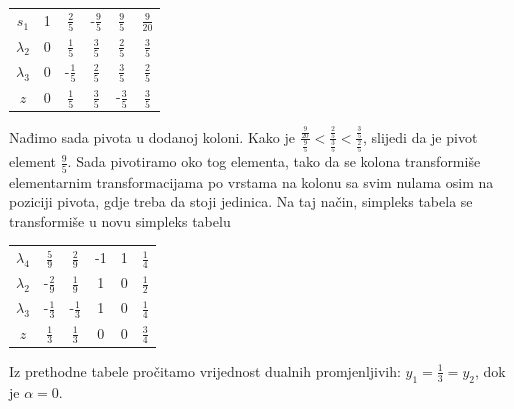 \documentclass[b5paper, utf8, 11pt, colorlinks]{book}
\theoremstyle{definition}
\begin{document}
\begin{center}
	
	\begin{tabular}{c|cccc|c}\vspace{1mm}
		$s_1$	    &   1      &    $\frac{2}{5}$          &   -$\frac{9}{5}$       &  $\frac{9}{5} $        &  $\frac{9}{20}$ \\\vspace{1mm}
		$\lambda_2$  &   0      &    $\frac{1}{5}$         &   $\frac{3}{5}$        &   $\frac{2}{5}$        &  $\frac{3}{5}$             \\\vspace{1mm}
		$\lambda_3$  &   0      &    -$\frac{1}{5}$        &   $\frac{2}{5}$        &   $\frac{3}{5}$         &  $\frac{2}{5}$            \\ \hline\vspace{1mm}
		$z$          &   0      &    $\frac{1}{5}$         &  $ \frac{3}{5}$        &   -$\frac{3}{5}$         & $\frac{3}{5}$
	\end{tabular}
	
\end{center} 
Nađimo sada pivota u dodanoj koloni. Kako je $\frac{\frac{9}{20}}{\frac95} < \frac{\frac25}{\frac35}< \frac{\frac35}{\frac25}$, slijedi da je pivot element $\frac{9}{5}$.  Sada pivotiramo oko tog elementa, tako da se kolona transformiše elementarnim transformacijama po vrstama na kolonu sa svim nulama osim na poziciji pivota, gdje treba da stoji jedinica. Na taj način, simpleks tabela se transformiše u novu simpleks tabelu 
\begin{center}
	
	\begin{tabular}{c|cccc|c}\vspace{1mm}
		$\lambda_4$	 &   $\frac{5}{9}$      &    $\frac{2}{9}$          &   -1       &  1      &  $\frac{1}{4}$ \\\vspace{1mm}
		$\lambda_2$  &   -$\frac{2}{9}$    &   $\frac{1}{9}$        &   1        &   0         &  $\frac{1}{2}$        \\\vspace{1mm}
	    $\lambda_3$  &  -$\frac{1}{3}$     &    -$\frac{1}{3}$      &   1        &   0        &  $\frac{1}{4}$      
		    \\ \hline\vspace{1mm}
		$z$          &   $\frac{1}{3}$     &    $\frac{1}{3}$         &  $0$        &  0         & $\frac{3}{4}$
	\end{tabular}
	
\end{center} 
Iz prethodne tabele pročitamo vrijednost dualnih promjenljivih: $y_1 =  \frac{1}{3}=y_2$, dok je $\alpha=0$. 
\end{document}
